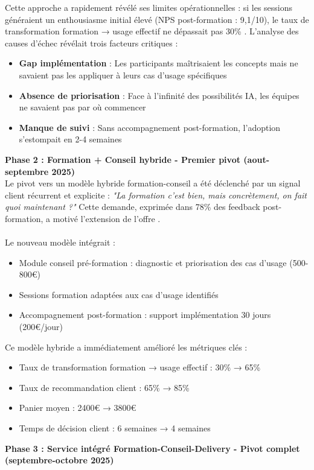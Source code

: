 Cette approche a rapidement révélé ses limites opérationnelles : si les sessions généraient un enthousiasme initial élevé (NPS post-formation : 9,1/10), le taux de transformation formation → usage effectif ne dépassait pas 30\% \cite{luwai2025metrics}. L'analyse des causes d'échec révélait trois facteurs critiques :
\begin{itemize}
    \item \textbf{Gap implémentation} : Les participants maîtrisaient les concepts mais ne savaient pas les appliquer à leurs cas d'usage spécifiques
    \item \textbf{Absence de priorisation} : Face à l'infinité des possibilités IA, les équipes ne savaient pas par où commencer
    \item \textbf{Manque de suivi} : Sans accompagnement post-formation, l'adoption s'estompait en 2-4 semaines
\end{itemize}
\medskip
\textbf{Phase 2 : Formation + Conseil hybride - Premier pivot (aout-septembre 2025)}\\
Le pivot vers un modèle hybride formation-conseil a été déclenché par un signal client récurrent et explicite : \emph{"La formation c'est bien, mais concrètement, on fait quoi maintenant ?"} Cette demande, exprimée dans 78\% des feedback post-formation, a motivé l'extension de l'offre \cite{luwai2025feedback}.
\\\\
Le nouveau modèle intégrait :
\begin{itemize}
    \item Module conseil pré-formation : diagnostic et priorisation des cas d'usage (500-800€)
    \item Sessions formation adaptées aux cas d'usage identifiés
    \item Accompagnement post-formation : support implémentation 30 jours (200€/jour)
\end{itemize}
\medskip
Ce modèle hybride a immédiatement amélioré les métriques clés :
\begin{itemize}
    \item Taux de transformation formation → usage effectif : 30\% → 65\%
    \item Taux de recommandation client : 65\% → 85\%
    \item Panier moyen : 2400€ → 3800€
    \item Temps de décision client : 6 semaines → 4 semaines
\end{itemize}
\medskip
\textbf{Phase 3 : Service intégré Formation-Conseil-Delivery - Pivot complet (septembre-octobre 2025)}\\
